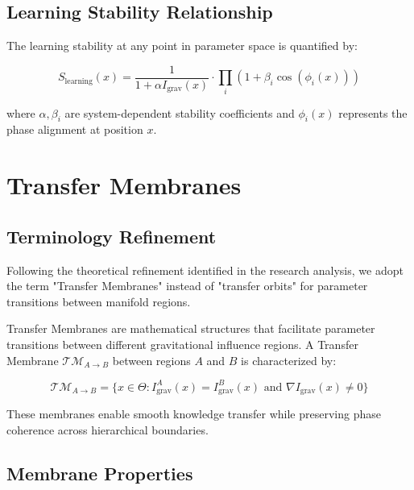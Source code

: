 \subsection{Learning Stability Relationship}

The learning stability at any point in parameter space is quantified by:

\begin{equation}
S_{\text{learning}}(x) = \frac{1}{1 + \alpha I_{\text{grav}}(x)} \cdot \prod_{i} \left(1 + \beta_i \cos(\phi_i(x))\right)
\end{equation}

where $\alpha, \beta_i$ are system-dependent stability coefficients and $\phi_i(x)$ represents the phase alignment at position $x$.

\section{Transfer Membranes}

\subsection{Terminology Refinement}

Following the theoretical refinement identified in the research analysis, we adopt the term "Transfer Membranes" instead of "transfer orbits" for parameter transitions between manifold regions.

\begin{definition}
\label{def:transfer_membranes}
Transfer Membranes are mathematical structures that facilitate parameter transitions between different gravitational influence regions. A Transfer Membrane $\mathcal{TM}_{A \rightarrow B}$ between regions $A$ and $B$ is characterized by:

\begin{equation}
\mathcal{TM}_{A \rightarrow B} = \{x \in \Theta : I_{\text{grav}}^A(x) = I_{\text{grav}}^B(x) \text{ and } \nabla I_{\text{grav}}(x) \neq 0\}
\end{equation}

These membranes enable smooth knowledge transfer while preserving phase coherence across hierarchical boundaries.
\end{definition}

\subsection{Membrane Properties}

